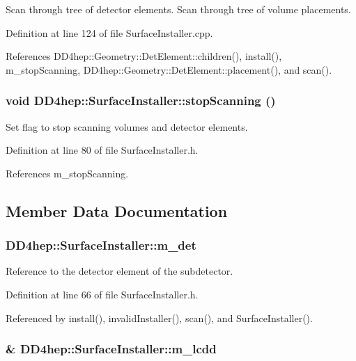 Scan through tree of detector elements. Scan through tree of volume placements. 

Definition at line 124 of file SurfaceInstaller.cpp.

References DD4hep::Geometry::DetElement::children(), install(), m\_\-stopScanning, DD4hep::Geometry::DetElement::placement(), and scan().\hypertarget{class_d_d4hep_1_1_surface_installer_a57fe4482c0759fc874a4248c0f4d89d8}{
\subsubsection[{stopScanning}]{\setlength{\rightskip}{0pt plus 5cm}void DD4hep::SurfaceInstaller::stopScanning ()}}
\label{class_d_d4hep_1_1_surface_installer_a57fe4482c0759fc874a4248c0f4d89d8}


Set flag to stop scanning volumes and detector elements. 

Definition at line 80 of file SurfaceInstaller.h.

References m\_\-stopScanning.

\subsection{Member Data Documentation}
\hypertarget{class_d_d4hep_1_1_surface_installer_a8a8f3acac5b96cd94464d886e06bf6df}{
\subsubsection[{m\_\-det}]{ {\bf DD4hep::SurfaceInstaller::m\_\-det}}}
\label{class_d_d4hep_1_1_surface_installer_a8a8f3acac5b96cd94464d886e06bf6df}


Reference to the detector element of the subdetector. 

Definition at line 66 of file SurfaceInstaller.h.

Referenced by install(), invalidInstaller(), scan(), and SurfaceInstaller().\hypertarget{class_d_d4hep_1_1_surface_installer_a557d1f8fd057ae637f855dca603ebaf9}{
\subsubsection[{m\_\-lcdd}]{\& {\bf DD4hep::SurfaceInstaller::m\_\-lcdd}}}
\label{class_d_d4hep_1_1_surface_installer_a557d1f8fd057ae637f855dca603ebaf9}


